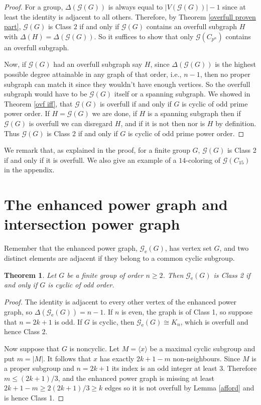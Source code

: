 \documentclass{article}
\newtheorem{theorem}{Theorem}[section]
\theoremstyle{definition}
\theoremstyle{indentclaim}
\theoremstyle{named}
\theoremstyle{named}
\begin{document}
\begin{proof}
    For a group, $\Delta(\mathscr{G}(G))$ is always equal to $|V(\mathscr{G}(G))| - 1$ since at least the identity is adjacent to all others. Therefore, by Theorem \ref{overfull proven part}, $\mathscr{G}(G)$ is Class $2$ if and only if $\mathscr{G}(G)$ contains an overfull subgraph $H$ with $\Delta(H) = \Delta(\mathscr{G}(G))$. So it suffices to show that only $\mathscr{G}(C_{p^\alpha})$ contains an overfull subgraph. 

    Now, if $\mathscr{G}(G)$ had an overfull subgraph say $H$, since $\Delta(\mathscr{G}(G))$ is the highest possible degree attainable in any graph of that order, i.e., $n-1$, then no proper subgraph can match it since they wouldn't have enough vertices. So the overfull subgraph would have to be $\mathscr{G}(G)$ itself or a spanning subgraph. We showed in Theorem \ref{ovf iff}, that $\mathscr{G}(G)$ is overfull if and only if $G$ is cyclic of odd prime power order. If $H  = \mathscr{G}(G)$ we are done, if $H$ is a spanning subgraph then if $\mathscr{G}(G)$ is overfull we can disregard $H$, and if it is not then nor is $H$ by definition. 
    Thus $\mathscr{G}(G)$ is Class 2 if and only if $G$ is cyclic of odd prime power order.
\end{proof}

We remark that, as explained in the proof, for a finite group $G$, $\mathscr{G}(G)$ is Class 2 if and only if it is overfull. We also give an example of a $14$-coloring of $\mathscr{G}(C_{15})$ in the appendix. 

\section{The enhanced power graph and intersection power graph}

Remember that the enhanced power graph, $\mathscr{G}_{\mathrm{e}}(G)$, has vertex set $G$, and two distinct elements are adjacent if
they belong to a common cyclic subgroup. 

\begin{theorem}
\label{thm:enhanced-power}
Let $G$ be a finite group of order $n\geq 2$. Then
$\mathscr{G}_{\mathrm{e}}(G)$ is Class 2 if
and only if $G$ is cyclic of odd order.
\end{theorem}

\begin{proof}
The identity is adjacent to every other vertex of the enhanced power graph, so $\Delta(\mathscr{G}_{\mathrm{e}}(G))=n-1$. 
If $n$ is even, the graph is of Class 1, so suppose that $n = 2k+1$ is odd. If $G$ is cyclic, then $\mathscr{G}_{\mathrm{e}}(G)\cong K_n$, which is overfull and hence Class 2.

Now suppose that $G$ is noncyclic. Let $M=\langle x\rangle$ be a maximal
cyclic subgroup and put $m=|M|$. It follows that $x$ has exactly $ 2k+1 -m$ non-neighbours. Since $M$ is a proper subgroup and $n = 2k+1$ its index is an odd integer at
least $3$. Therefore $m\leq (2k+1)/3$, and the enhanced power graph is missing at
least $2k+1-m \geq 2(2k+1)/3\geq k$ edges so it is not overfull by Lemma \ref{afford} and is hence Class 1. 
\end{proof}
\end{document}
